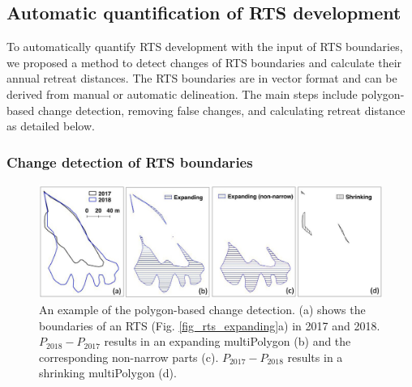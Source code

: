 \documentclass[authoryear,preprint,review,12pt]{elsarticle}
\begin{document}
\subsection{Automatic quantification of RTS development}
\label{sec_auto_rts_develop}

To automatically quantify RTS development with the input of RTS boundaries, we proposed a method to detect changes of RTS boundaries and calculate their annual retreat distances.
The RTS boundaries are in vector format and can be derived from manual or automatic delineation. 
The main steps include polygon-based change detection, removing false changes, and calculating retreat distance as detailed below. 

\subsubsection{Change detection of RTS boundaries}
\label{sec_polygon_change_det}

\begin{figure} 
	\centering
	\includegraphics[width=14cm]{figs/rts_polygon_change_det_trim.jpg}
	\caption{An example of the polygon-based change detection. (a) shows the boundaries of an RTS (Fig. \ref{fig_rts_expanding}a) in 2017 and 2018. $P_{2018}-P_{2017}$ results in an expanding multiPolygon (b) and the corresponding non-narrow parts (c). $P_{2017}-P_{2018}$ results in a shrinking multiPolygon (d).}
	\label{fig_rts_change_det}
\end{figure}
\end{document}
